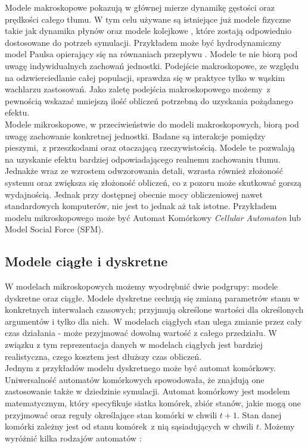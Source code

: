 Modele makroskopowe pokazują w głównej mierze dynamikę gęstości oraz prędkości całego tłumu. W tym celu używane są istniejące już modele fizyczne takie jak dynamika płynów oraz modele kolejkowe \cite{relativeVelocity}, które zostają odpowiednio dostosowane do potrzeb symulacji. Przykładem może być hydrodynamiczny model Paulsa opierający się na równaniach przepływu \cite{ArchitekturaModelowania}. Modele te nie biorą pod uwagę indywidualnych zachowań jednostki. Podejście makroskopowe, ze względu na odzwierciedlanie całej populacji, sprawdza się w praktyce tylko w wąskim wachlarzu zastosowań. Jako zaletę podejścia makroskopowego możemy~z pewnością wskazać mniejszą ilość obliczeń potrzebną do uzyskania pożądanego efektu. \\

Modele mikroskopowe, w przeciwieństwie do modeli makroskopowych, biorą pod uwagę zachowanie konkretnej jednostki. Badane są interakcje pomiędzy pieszymi,~z przeszkodami oraz otaczającą rzeczywistością. Modele te pozwalają na uzyskanie efektu bardziej odpowiadającego realnemu zachowaniu tłumu. Jednakże wraz ze wzrostem odwzorowania detali, wzrasta również złożoność systemu oraz zwiększa się złożoność obliczeń, co z pozoru może skutkować gorszą wydajnością. Jednak przy dostępnej obecnie mocy obliczeniowej nawet standardowych komputerów, nie jest to jednak aż tak istotne. Przykładem modelu mikroskopowego może być Automat Komórkowy \textit{Cellular Automaton} lub Model Social Force (SFM). 

\subsection{Modele ciągłe i dyskretne}

W modelach mikroskopowych możemy wyodrębnić dwie podgrupy: modele dyskretne oraz ciągłe. Modele dyskretne cechują się zmianą parametrów stanu w konkretnych interwalach czasowych; przyjmują określone wartości dla określonych argumentów i tylko dla nich.~W modelach ciągłych stan ulega zmianie przez cały czas działania - może przyjmować dowolną wartość z całego przedziału. W związku z tym reprezentacja danych w modelach ciągłych jest bardziej realistyczna, czego kosztem jest dłuższy czas obliczeń. \\

Jednym z przykładów modelu dyskretnego może być automat komórkowy. Uniwersalność automatów komórkowych  spowodowała, że znajdują one zastosowanie także w dziedzinie symulacji. Automat komórkowy jest modelem matematycznym, który specyfikuje siatka komórek, zbiór stanów, jakie mogą one przyjmować oraz reguły określające stan komórki w chwili $t + 1$. Stan danej komórki zależny jest od stanu komórek~z nią sąsiadujących w chwili $t$. Możemy wyróżnić kilka rodzajów automatów \cite{modelowanieDynamikiTlumu}:

